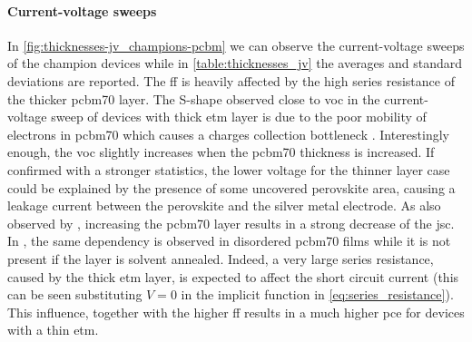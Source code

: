 	\paragraph{Current-voltage sweeps}
	In \cref{fig:thicknesses-jv_champions-pcbm} we can observe the current-voltage sweeps of the champion devices while in \cref{table:thicknesses_jv} the averages and standard deviations are reported.
	The \gls{ff} is heavily affected by the high series resistance of the thicker \gls{pcbm70} layer.
	The S-shape observed close to \gls{voc} in the current\hyp{}voltage sweep of devices with thick \gls{etm} layer is due to the poor mobility of electrons in \gls{pcbm70} \cite{VonHauff2005} which causes a charges collection bottleneck \cite{Wheeler2015}.
	Interestingly enough, the \gls{voc} slightly increases when the \gls{pcbm70} thickness is increased.
	If confirmed with a stronger statistics, the lower voltage for the thinner layer case could be explained by the presence of some uncovered perovskite area, causing a leakage current between the perovskite and the silver metal electrode.
	As also observed by , increasing the \gls{pcbm70} layer results in a strong decrease of the \gls{jsc}.
	In , the same dependency is observed in disordered \gls{pcbm70} films while it is not present if the layer is solvent annealed.
	Indeed, a very large series resistance, caused by the thick \gls{etm} layer, is expected to affect the short circuit current (this can be seen substituting $V=0$ in the implicit function in \cref{eq:series_resistance}).
	This influence, together with the higher \gls{ff} results in a much higher \gls{pce} for devices with a thin \gls{etm}.


